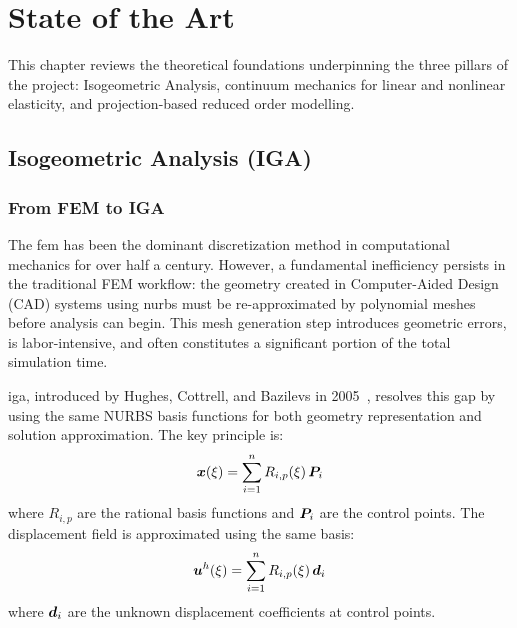 \chapter{State of the Art}
\label{ch:state-of-art}

This chapter reviews the theoretical foundations underpinning the three pillars of the project: Isogeometric Analysis, continuum mechanics for linear and nonlinear elasticity, and projection-based reduced order modelling.

\section{Isogeometric Analysis (IGA)}
\label{sec:iga}

\subsection{From FEM to IGA}

The \acrfull{fem} has been the dominant discretization method in computational mechanics for over half a century. However, a fundamental inefficiency persists in the traditional FEM workflow: the geometry created in Computer-Aided Design (CAD) systems using \acrfull{nurbs} must be re-approximated by polynomial meshes before analysis can begin. This mesh generation step introduces geometric errors, is labor-intensive, and often constitutes a significant portion of the total simulation time.

\acrfull{iga}, introduced by Hughes, Cottrell, and Bazilevs in 2005~\cite{hughes2005}, resolves this gap by using the same NURBS basis functions for both geometry representation and solution approximation. The key principle is:
\begin{equation}
    \bm{x}(\xi) = \sum_{i=1}^{n} R_{i,p}(\xi) \, \bm{P}_i
    \label{eq:iga-mapping}
\end{equation}
where $R_{i,p}$ are the rational basis functions and $\bm{P}_i$ are the control points. The displacement field is approximated using the same basis:
\begin{equation}
    \bm{u}^h(\xi) = \sum_{i=1}^{n} R_{i,p}(\xi) \, \bm{d}_i
\end{equation}
where $\bm{d}_i$ are the unknown displacement coefficients at control points.

